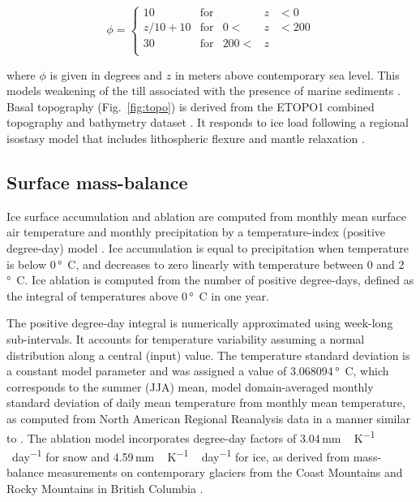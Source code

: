 \begin{equation}
	\phi = \left\{\begin{array}{llrll}
		10      & \mathrm{for} &      &z&<  0 \\
		z/10+10 & \mathrm{for} &   0 <&z&<200 \\
		30      & \mathrm{for} & 200 <&z&     \\
	\end{array}\right.
\end{equation}

where $\phi$ is given in degrees and $z$ in meters above contemporary sea level. This models weakening of the till associated with the presence of marine sediments \citep{martin-etal-2011,aschwanden-etal-2013}. Basal topography (Fig.~\ref{fig:topo}) is derived from the ETOPO1 combined topography and bathymetry dataset \citep{data:etopo1}. It responds to ice load following a regional isostasy model that includes lithospheric flexure and mantle relaxation \citep{lingle-clark-1985}.


\subsection{Surface mass-balance}

Ice surface accumulation and ablation are computed from monthly mean surface air temperature and monthly precipitation by a temperature-index (positive degree-day) model \citep{hock-2003}. Ice accumulation is equal to precipitation when temperature is below 0\,\unit{\degree C}, and decreases to zero linearly with temperature between 0 and 2\,\unit{\degree C}. Ice ablation is computed from the number of positive degree-days, defined as the integral of temperatures above 0\,\unit{\degree C} in one year. 

The positive degree-day integral \citep{calov-greve-2005} is numerically approximated using week-long sub-intervals. It accounts for temperature variability assuming a normal distribution along a central (input) value. The temperature standard deviation is a constant model parameter and was assigned a value of 3.068094\,\unit{\degree C}, which corresponds to the summer (JJA) mean, model domain-averaged monthly standard deviation of daily mean temperature from monthly mean temperature, as computed from North American Regional Reanalysis data \citep{data:narr} in a manner similar to \citet{seguinot-inreview}. The ablation model incorporates degree-day factors of 3.04\,\unit{mm\,K^{-1}\,day^{-1}} for snow and 4.59\,\unit{mm\,K^{-1}\,day^{-1}} for ice, as derived from mass-balance measurements on contemporary glaciers from the Coast Mountains and Rocky Mountains in British Columbia \citep{shea-etal-2009}.

